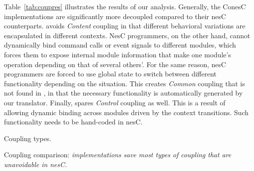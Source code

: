  Table~\ref{tab:coupres} illustrates the results of
our analysis. Generally, the ConesC implementations are significantly
more decoupled compared to their nesC counterparts. \conesc avoids
\emph{Content} coupling in that different behavioral variations are
encapsulated in different contexts. NesC programmers, on the other
hand, cannot dynamically bind command calls or event signals to
different modules, which forces them to expose internal module
information that make one module's operation depending on that of
several others'. For the same reason, nesC programmers are forced to
use global state to switch between different functionality depending
on the situation. This creates \emph{Common} coupling that is not
found in \conesc, in that the necessary functionality is automatically
generated by our translator. Finally, \conesc spares \emph{Control}
coupling as well. This is a result of allowing dynamic binding across
modules driven by the context transitions. Such functionality needs to
be hand-coded in nesC.

\begin{table}[!tb]
\renewcommand{\arraystretch}{1.3}
\caption{Coupling types.}
\vspace{-2mm}
\label{tab:couptypes}

\vspace{-2mm}
\end{table}

\begin{table}[!tb]
\renewcommand{\arraystretch}{1.3}
\caption{Coupling comparison: \emph{\conesc implementations save most types of coupling that are unavoidable in nesC.}}
\vspace{-2mm}
\label{tab:coupres}

\vspace{-4mm}
\end{table}




